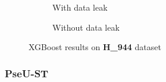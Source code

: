         \begin{figure}[H]
            \centering
            \begin{subfigure}{0.47\textwidth}
              \centering
              \resizebox{\textwidth}{!}{}
              \captionsetup{justification=centering}
              \caption{With data leak}
            \end{subfigure}%
            \hspace{0.05\textwidth}
            \begin{subfigure}{0.47\textwidth}
              \centering
              \resizebox{\textwidth}{!}{}
              \captionsetup{justification=centering}
              \caption{Without data leak}
            \end{subfigure}
            \caption{XGBoost results on \textbf{H\_944} dataset}\label{fig:porpoise_m944}
        \end{figure}

    \subsubsection{PseU-ST \cite{zhang_pseu-st_2023}}
